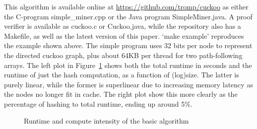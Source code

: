 \documentclass[11pt, oneside]{article}
\begin{document}
This algorithm is available online at \url{https://github.com/tromp/cuckoo}
as either the C-program simple\_miner.cpp or the Java program SimpleMiner.java.
A proof verifier is available as cuckoo.c or Cuckoo.java, while the repository
also has a Makefile, as well as the latest version of this paper.
`make example' reproduces the example shown above.
The simple program uses 32 bits per node to represent the directed cuckoo graph,
plus about 64KB per thread for two path-following arrays.
The left plot in Figure~\ref{runtimes} shows both the total runtime in seconds and the runtime of just
the hash computation, as a function of (log)size. The latter is purely
linear, while the former is superlinear due to increasing memory latency
as the nodes no longer fit in cache. The right plot show this more clearly
as the percentage of hashing to total runtime, ending up around 5\%.

\begin{figure}
\begin{center}
\end{center}
\caption{Runtime and compute intensity of the basic algorithm}
\label{runtimes}
\end{figure}
\end{document}
